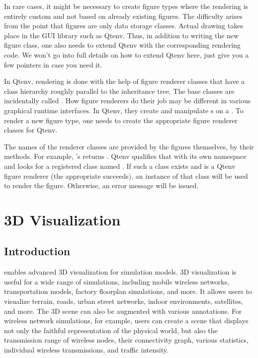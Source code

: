 In rare cases, it might be necessary to create figure types where the rendering
is entirely custom and not based on already existing figures. The
difficulty arises from the point that figures are only data storage classes.
Actual drawing takes place in the GUI library such as Qtenv.
Thus, in addition to writing the new figure class, one also needs to extend
Qtenv with the corresponding rendering code.
We won't go into full details on how to extend Qtenv here, just give
you a few pointers in case you need it.

In Qtenv, rendering is done with the help of figure renderer
classes that have a class hierarchy roughly parallel to the
 inheritance tree. The base classes are incidentally called
. How figure renderers do their job may be different in
various graphical runtime interfaces. In Qtenv, they create and manipulate
s on a . To render a
new figure type, one needs to create the appropriate figure renderer
classes for Qtenv.

The names of the renderer classes are provided by the figures themselves,
by their  methods. For example,
's  returns
. Qtenv qualifies that with its own namespace and
looks for a registered class named
. If such a class exists and is a
Qtenv figure renderer (the appropriate  succeeds), an
instance of that class will be used to render the figure. Otherwise, an
error message will be issued.


\section{3D Visualization}
\label{sec:graphics:osg}

\subsection{Introduction}
\label{sec:graphics:osg-introduction}

{\opp} enables advanced 3D visualization for simulation models. 3D visualization
is useful for a wide range of simulations, including mobile wireless networks,
transportation models, factory floorplan simulations, and more. It allows users
to visualize terrain, roads, urban street networks, indoor environments,
satellites, and more. The 3D scene can also be augmented with various
annotations. For wireless network simulations, for example, users can create a
scene that displays not only the faithful representation of the physical world,
but also the transmission range of wireless nodes, their connectivity graph,
various statistics, individual wireless transmissions, and traffic intensity.

